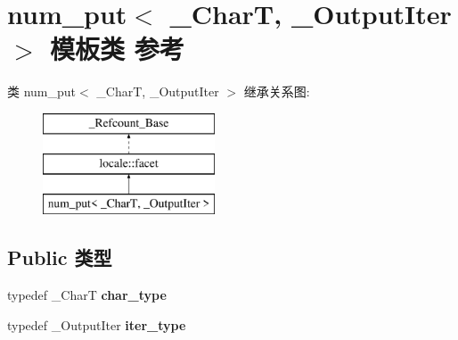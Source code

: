 \hypertarget{classnum__put}{}\section{num\+\_\+put$<$ \+\_\+\+CharT, \+\_\+\+Output\+Iter $>$ 模板类 参考}
\label{classnum__put}
类 num\+\_\+put$<$ \+\_\+\+CharT, \+\_\+\+Output\+Iter $>$ 继承关系图\+:\begin{figure}[H]
\begin{center}
\leavevmode
\includegraphics[height=3.000000cm]{classnum__put}
\end{center}
\end{figure}
\subsection*{Public 类型}
\begin{DoxyCompactItemize}
\item 
\mbox{\label{classnum__put_aa2646b841e17e895733191cae4210a73}} 
typedef \+\_\+\+CharT {\bfseries char\+\_\+type}
\item 
\mbox{\label{classnum__put_ab738d2c425189800331d8f3e8719ca44}} 
typedef \+\_\+\+Output\+Iter {\bfseries iter\+\_\+type}
\end{DoxyCompactItemize}
